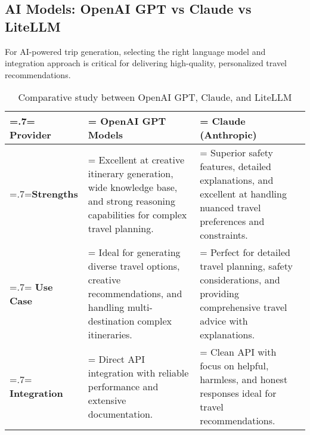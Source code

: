 \subsection{AI Models: OpenAI GPT vs Claude vs LiteLLM}
For AI-powered trip generation, selecting the right language model and integration approach is critical for delivering high-quality, personalized travel recommendations.

\begin{table}[H]
    \renewcommand{\arraystretch}{1.5}%
    \caption{Comparative study between OpenAI GPT, Claude, and LiteLLM}
    \centering
    \medskip
    \begin{tabularx}{1\textwidth} {
            | >{\hsize=.7\hsize\linewidth=\hsize\centering\arraybackslash}X
            | >{\hsize=1.15\hsize\linewidth=\hsize\justifying\arraybackslash}X
            | >{\hsize=1.15\hsize\linewidth=\hsize\justifying\arraybackslash}X |}
        \hline
        \rowcolor{primary} \textbf {Provider} & \textbf {OpenAI GPT Models}                                                                                                               & \textbf {Claude (Anthropic)}                                                                                                        \\
        \hline
        \textbf {Strengths}                   & \noindent Excellent at creative itinerary generation, wide knowledge base, and strong reasoning capabilities for complex travel planning. & \noindent Superior safety features, detailed explanations, and excellent at handling nuanced travel preferences and constraints.    \\
        \hline
        \textbf {Use Case}                    & \noindent Ideal for generating diverse travel options, creative recommendations, and handling multi-destination complex itineraries.      & \noindent Perfect for detailed travel planning, safety considerations, and providing comprehensive travel advice with explanations. \\
        \hline
        \textbf {Integration}                 & \noindent Direct API integration with reliable performance and extensive documentation.                                                   & \noindent Clean API with focus on helpful, harmless, and honest responses ideal for travel recommendations.                         \\
        \hline
    \end{tabularx}
\end{table}

